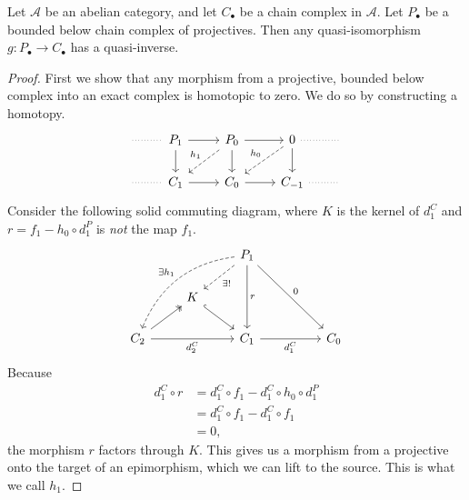 \documentclass[main.tex]{subfiles}
\begin{document}
\begin{proposition}
  Let $\mathcal{A}$ be an abelian category, and let $C_{\bullet}$ be a chain complex in $\mathcal{A}$. Let $P_{\bullet}$ be a bounded below chain complex of projectives. Then any quasi-isomorphism $g\colon P_{\bullet} \to C_{\bullet}$ has a quasi-inverse.
\end{proposition}
\begin{proof}
  First we show that any morphism from a projective, bounded below complex into an exact complex is homotopic to zero. We do so by constructing a homotopy.
  \begin{equation*}
    \begin{tikzcd}
      \
      \arrow[r, dotted, no head]
      & P_{1}
      \arrow[r]
      \arrow[d]
      & P_{0}
      \arrow[r]
      \arrow[d]
      \arrow[dl, dashed, swap, "h_{1}"]
      & 0
      \arrow[d]
      \arrow[dl, dashed, swap, "h_{0}"]
      \arrow[r, dotted, no head]
      &\
      \\
      \
      \arrow[r, dotted, no head]
      & C_{1}
      \arrow[r]
      & C_{0}
      \arrow[r]
      & C_{-1}
      \arrow[r, dotted, no head]
      &\
    \end{tikzcd}
  \end{equation*}
  Consider the following solid commuting diagram, where $K$ is the kernel of $d^{C}_{1}$ and $r = f_{1} - h_{0} \circ d^{P}_{1}$ is \emph{not} the map $f_{1}$.
  \begin{equation*}
    \begin{tikzcd}
      && P_{1}
      \arrow[dd, "r"]
      \arrow[ddrr, "0"]
      \arrow[dl, dashed, "\exists!"]
      \arrow[ddll, dashed, bend right, swap, "\exists h_{1}"]
      \\
      & K
      \arrow[dr, hookrightarrow]
      \\
      C_{2}
      \arrow[ur, twoheadrightarrow]
      \arrow[rr, swap, "d^{C}_{2}"]
      && C_{1}
      \arrow[rr, swap, "d^{C}_{1}"]
      && C_{0}
    \end{tikzcd}
  \end{equation*}
  Because
  \begin{align*}
    d^{C}_{1} \circ r &= d^{C}_{1} \circ f_{1} - d^{C}_{1} \circ h_{0} \circ d^{P}_{1} \\
    &= d^{C}_{1} \circ f_{1} - d^{C}_{1} \circ f_{1} \\
    &= 0,
  \end{align*}
  the morphism $r$ factors through $K$. This gives us a morphism from a projective onto the target of an epimorphism, which we can lift to the source. This is what we call $h_{1}$.


\end{proof}
\end{document}
